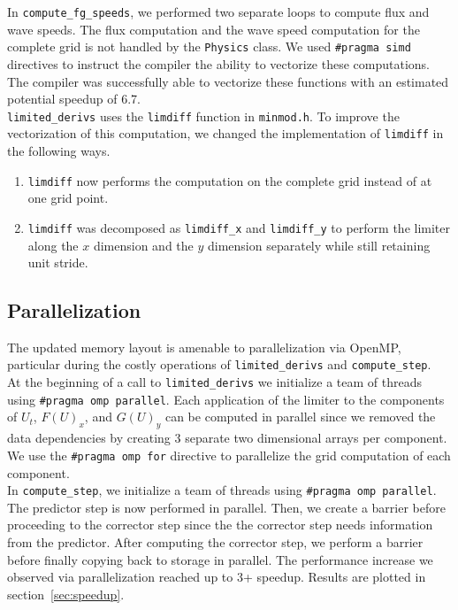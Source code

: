 \documentclass[11pt]{article}
\begin{document}
In \texttt{compute\_fg\_speeds}, we performed two separate loops to compute flux and wave speeds. The flux computation and the wave speed computation for the complete grid is not handled by the \texttt{Physics} class. We used \texttt{\#pragma simd} directives to instruct the compiler the ability to vectorize these computations. The compiler was successfully able to vectorize these functions with an estimated potential speedup of 6.7. \\

\texttt{limited\_derivs} uses the \texttt{limdiff} function in \texttt{minmod.h}. To improve the vectorization of this computation, we changed the implementation of \texttt{limdiff} in the following ways. 

\begin{enumerate}
	\item \texttt{limdiff} now performs the computation on the complete grid instead of at one grid point.
	\item \texttt{limdiff} was decomposed as \texttt{limdiff\_x} and \texttt{limdiff\_y} to perform the limiter along the $x$ dimension and the $y$ dimension separately while still retaining unit stride. 
\end{enumerate}

\subsection{Parallelization}
The updated memory layout is amenable to parallelization via OpenMP, particular during the costly operations of \texttt{limited\_derivs} and \texttt{compute\_step}. \\

At the beginning of a call to \texttt{limited\_derivs} we initialize a team of threads using \texttt{\#pragma omp parallel}. Each application of the limiter to the components of $U_t$, $F(U)_x$, and $G(U)_y$ can be computed in parallel since we removed the data dependencies by creating 3 separate two dimensional arrays per component. We use the \texttt{\#pragma omp for} directive to parallelize the grid computation of each component. \\

In \texttt{compute\_step}, we initialize a team of threads using \texttt{\#pragma omp parallel}. The predictor step is now performed in parallel. Then, we create a barrier before proceeding to the corrector step since the the corrector step needs information from the predictor. After computing the corrector step, we perform a barrier before finally copying back to storage in parallel. The performance increase we observed via parallelization reached up to 3+ speedup. Results are plotted in section~\ref{sec:speedup}.
\end{document}
